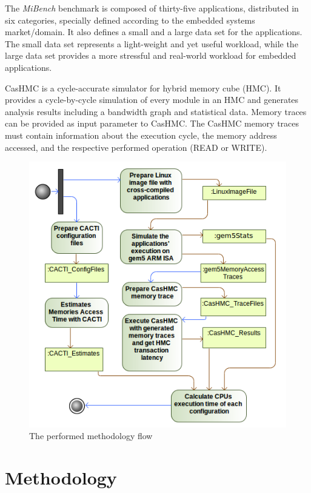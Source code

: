 \documentclass{sig-alternate-05-2015}
\begin{document}
The \emph{MiBench} benchmark \cite{Guthaus:2001:Mibench} is composed of thirty-five applications, distributed in six categories, specially defined according to the embedded systems market/domain. It also defines a small and a large data set for the applications. The small data set represents a light-weight and yet useful workload, while the large data set provides a more stressful and real-world workload for embedded
applications. 

CasHMC \cite{jeon2017cashmc} is a cycle-accurate simulator for hybrid memory cube (HMC). It provides a cycle-by-cycle simulation of every module in an HMC and generates analysis results including a bandwidth graph and statistical data. Memory traces can be provided as input parameter to CasHMC. The CasHMC memory traces must contain information about the execution cycle, the memory address accessed, and the respective performed operation (READ or WRITE).

\begin{figure}
	\centering
\includegraphics[scale=0.35]{images/Metodologia}\caption{\label{fig:The-performed-methodology}The performed methodology flow}
\end{figure}

\section{Methodology } \label{sec:Methodology}
\end{document}
